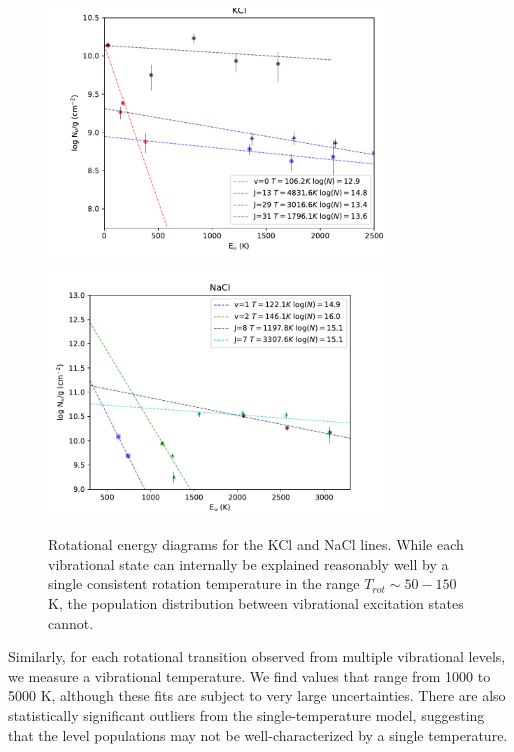 \documentclass[twocolumn]{aastex62}
\begin{document}
\begin{figure}[!htp]
\includegraphics[scale=1,width=3.5in]{figures/KCl_rotational_diagrams.pdf}
\includegraphics[scale=1,width=3.5in]{figures/NaCl_rotational_diagrams.pdf}
\caption{Rotational energy diagrams for the KCl and NaCl lines.  While each
vibrational state can internally be explained reasonably well by a single
consistent rotation temperature in the range $T_{rot}\sim50-150$ K, the population
distribution between vibrational excitation states cannot.}
\label{fig:rotationdiagrams}
\end{figure}


Similarly, for each rotational transition observed from multiple vibrational
levels, we measure a vibrational temperature.  We find values that range from
1000 to 5000 K, although these fits are subject to very large
uncertainties.
There are also statistically significant
outliers from the single-temperature model, suggesting that the level
populations may not be well-characterized by a single temperature.

\end{document}
